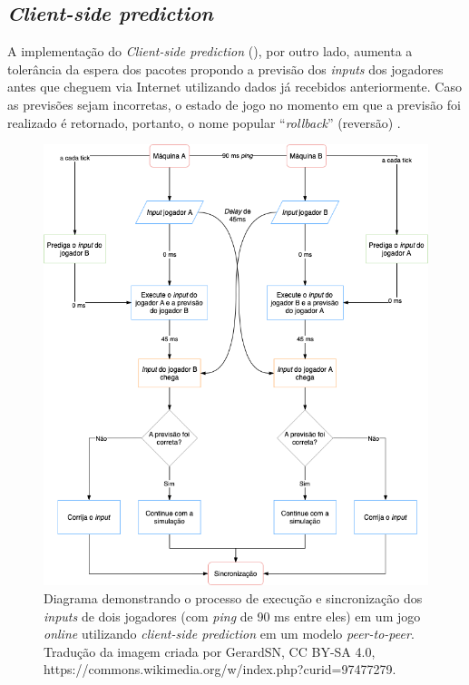 \subsection{\textit{Client-side prediction}}

A implementação do \textit{Client-side prediction} (), por outro lado, aumenta a tolerância da espera dos pacotes propondo a previsão dos \textit{inputs} dos jogadores antes que cheguem via Internet utilizando dados já recebidos anteriormente. Caso as previsões sejam incorretas, o estado de jogo no momento em que a previsão foi realizado é retornado, portanto, o nome popular ``\textit{rollback}'' (reversão) \cite{rollback}.

\begin{figure}[htbp]
\centering
\includegraphics[width=1\textwidth]{images/rollback.png}
\caption{Diagrama demonstrando o processo de execução e sincronização dos \textit{inputs} de dois jogadores (com \textit{ping} de 90 ms entre eles) em um jogo \textit{online} utilizando \textit{client-side prediction} em um modelo \textit{peer-to-peer}. Tradução da imagem criada por GerardSN, CC BY-SA 4.0, https://commons.wikimedia.org/w/index.php?curid=97477279.}
\label{fig:rollback_diagram}
\end{figure}

